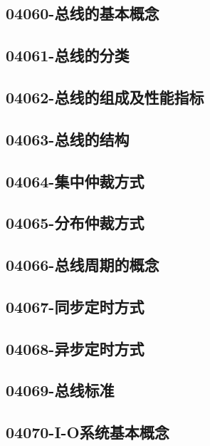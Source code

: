 \subsection{04060-总线的基本概念}

\subsection{04061-总线的分类}

\subsection{04062-总线的组成及性能指标}

\subsection{04063-总线的结构}

\subsection{04064-集中仲裁方式}

\subsection{04065-分布仲裁方式}

\subsection{04066-总线周期的概念}

\subsection{04067-同步定时方式}

\subsection{04068-异步定时方式}

\subsection{04069-总线标准}

\subsection{04070-I-O系统基本概念}


